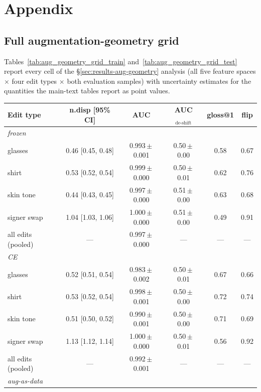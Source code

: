 \chapter{Appendix}
\section{Full augmentation-geometry grid}
\label{app:aug_geometry_grid}
Tables~\ref{tab:aug_geometry_grid_train} and~\ref{tab:aug_geometry_grid_test} report every cell of the \S\ref{sec:results-aug-geometry} analysis (all five feature spaces $\times$ four edit types $\times$ both evaluation samples) with uncertainty estimates for the quantities the main-text tables report as point values.

\begin{table}[H]
\centering
\footnotesize
\setlength{\tabcolsep}{3.5pt}
\begin{tabular}{lccccc}
\toprule
\textbf{Edit type} & \textbf{n.disp [95\% CI]} & \textbf{AUC} & \textbf{AUC$_{\text{de-shift}}$} & \textbf{gloss@1} & \textbf{flip} \\
\midrule
\multicolumn{6}{l}{\emph{frozen}} \\
\;\;glasses & 0.46 [0.45, 0.48] & 0.993\,$\pm$\,0.001 & 0.50\,$\pm$\,0.00 & 0.58 & 0.67 \\
\;\;shirt & 0.53 [0.52, 0.54] & 0.999\,$\pm$\,0.000 & 0.50\,$\pm$\,0.01 & 0.62 & 0.76 \\
\;\;skin tone & 0.44 [0.43, 0.45] & 0.997\,$\pm$\,0.000 & 0.51\,$\pm$\,0.00 & 0.63 & 0.68 \\
\;\;signer swap & 1.04 [1.03, 1.06] & 1.000\,$\pm$\,0.000 & 0.51\,$\pm$\,0.00 & 0.49 & 0.91 \\
\;\;all edits (pooled) & --- & 0.997\,$\pm$\,0.000 & --- & --- & --- \\
\midrule
\multicolumn{6}{l}{\emph{CE}} \\
\;\;glasses & 0.52 [0.51, 0.54] & 0.983\,$\pm$\,0.002 & 0.50\,$\pm$\,0.01 & 0.67 & 0.66 \\
\;\;shirt & 0.53 [0.52, 0.54] & 0.998\,$\pm$\,0.001 & 0.50\,$\pm$\,0.00 & 0.72 & 0.74 \\
\;\;skin tone & 0.51 [0.50, 0.52] & 0.990\,$\pm$\,0.001 & 0.50\,$\pm$\,0.00 & 0.71 & 0.69 \\
\;\;signer swap & 1.13 [1.12, 1.14] & 1.000\,$\pm$\,0.000 & 0.50\,$\pm$\,0.01 & 0.56 & 0.92 \\
\;\;all edits (pooled) & --- & 0.992\,$\pm$\,0.001 & --- & --- & --- \\
\midrule
\multicolumn{6}{l}{\emph{aug-as-data}} \\

\end{tabular}
\end{table}
